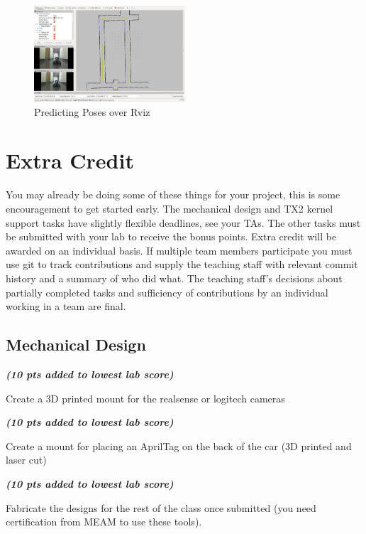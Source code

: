 \documentclass[letta4 paper]{article}
\numberwithin{equation}{section}
\newcommand{\0}{\mathbf{0}}
\begin{document}
		\begin{figure}[h]
		\centering
		\includegraphics[width=0.5\textwidth]{waypoints.png}
		\caption{Predicting Poses over Rviz}
	\end{figure}

	\section{Extra Credit}
	You may already be doing some of these things for your project, this is some encouragement to get started early. The mechanical design and TX2 kernel support tasks have slightly flexible deadlines, see your TAs. The other tasks must be submitted with your lab to receive the bonus points. Extra credit will be awarded on an individual basis. If multiple team members participate you must use git to track contributions and supply the teaching staff with relevant commit history and a summary of who did what. The teaching staff's decisions about partially completed tasks and sufficiency of contributions by an individual working in a team are final. 
	
	\subsection{Mechanical Design} \textit{\textbf{(10 pts added to lowest lab score)}}
	
	\noindent Create a 3D printed mount for the realsense or logitech cameras
	\newline
	
	\noindent\textit{\textbf{(10 pts added to lowest lab score)}}
	
	\noindent Create a mount for placing an AprilTag on the back of the car (3D printed and laser cut)
	\newline
	
	\noindent\textit{\textbf{(10 pts added to lowest lab score)}}
	
	\noindent Fabricate the designs for the rest of the class once submitted (you need certification from MEAM to use these tools). 
	
\end{document}

